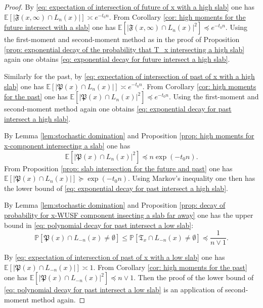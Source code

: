 \documentclass[12pt]{article}
\numberwithin{equation}{section}
\newcommand{\1}{\mathbf{1}}
\begin{document}
\begin{proof}
By \eqref{eq: expectation of intersection of future of x with a high slab} one has $\mathbb{E}[|\mathfrak{F}(x,\infty)\cap L_n(x)|]\asymp e^{-t_0n}$. From Corollary \ref{cor: high moments for the future intersect with a slab} one has $\mathbb{E}[|\mathfrak{F}(x,\infty)\cap L_n(x)|^2]\preceq e^{-t_0n}$. Using the first-moment and second-moment method as in the proof of Proposition \ref{prop: exponential decay of the probability that T_x intersecting a high slab} again one obtains \eqref{eq: exponential decay for future intersect a high slab}.

	
	Similarly for the past, by \eqref{eq: expectation of intersection of past of x with a high slab} one has $\mathbb{E}[|\mathfrak{P}(x)\cap L_n(x)|]\asymp e^{-t_0n}$. From Corollary \ref{cor: high moments for the past} one has $\mathbb{E}[|\mathfrak{P}(x)\cap L_n(x)|^2]\preceq e^{-t_0n}$. Using the first-moment and second-moment method  again one obtains \eqref{eq: exponential decay for past intersect a high slab}.
	
	By Lemma \ref{lem:stochastic domination} and Proposition \ref{prop: high moments for x-component intersecting a slab} one has \[
	\mathbb{E}[|\mathfrak{P}(x)\cap L_n(x)|^2]\preceq n\exp(-t_0n).
	\]
	From Proposition \ref{prop: slab intersection for the future and past} one has 
	$\mathbb{E}[|\mathfrak{P}(x)\cap L_n(x)|]\succeq \exp(-t_0n)$.
	Using Markov's inequality one then has  the lower bound of \eqref{eq: exponential decay for past intersect a high slab}. 
	
	By Lemma \ref{lem:stochastic domination} and Proposition \ref{prop: decay of probability for x-WUSF component insecting a slab far away} one has the upper bound in \eqref{eq: polynomial decay for past intersect a low slab}:
	\[
	\mathbb{P}[\mathfrak{P}(x)\cap  L_{-n}(x)\neq\emptyset]\leq	\mathbb{P}[\mathfrak{T}_x\cap  L_{-n}(x)\neq\emptyset] \preceq \frac{1}{n\vee 1}.
	\]
	
	By \eqref{eq: expectation of intersection of past of x with a low slab} one has  $\mathbb{E}[|\mathfrak{P}(x)\cap L_{-n}(x)|]\asymp 1$.  From Corollary \ref{cor: high moments for the past} one has $\mathbb{E}[|\mathfrak{P}(x)\cap L_{-n}(x)|^2]\preceq n\vee1$. Then the proof of the lower bound of \eqref{eq: polynomial decay for past intersect a low slab} is an application of second-moment method again.
\end{proof}
\end{document}
